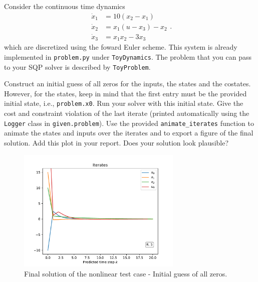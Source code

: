 \documentclass[]{article}
\begin{document}
Consider the continuous time dynamics 
\[
\begin{aligned}
  \dot{x}_1 &=  10(x_2 - x_1) \\
  \dot{x}_2 &= x_1(u - x_3) - x_2 \\
  \dot{x}_3 &= x_1x_2 - 3x_3 
\end{aligned}
.\] 
which are discretized using the foward Euler scheme. 
This system is already implemented in \texttt{problem.py} under \texttt{ToyDynamics}. 
The problem that you can pass to your SQP solver is described by \texttt{ToyProblem}.

\begin{assignment} \label{assgn:62}
	Construct an initial guess of all zeros for the inputs, the states and the costates.
	However, for the states, keep in mind that the first entry must be the provided initial 
	state, i.e., \texttt{problem.x0}. Run your solver with this 
	initial state. Give the cost and constraint violation of the last iterate
	(printed automatically using the \texttt{Logger} class in \texttt{given.problem}). 
	Use the provided \texttt{animate\_iterates} function to animate the states and inputs over the iterates and to export a 
	figure of the final solution. Add this plot in your report. Does your solution look plausible?
\end{assignment}
\begin{figure}[H]
	\centering
	\includegraphics[width=0.7\textwidth]{images/Assignment6-2.pdf}
	\caption{Final solution of the nonlinear test case - Initial guess of all zeros.}
	\label{fig:assignment6_2}
\end{figure}
\end{document}
